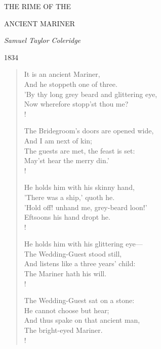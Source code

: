\documentclass[10pt,twoside]{memoir}
\begin{document}
\thispagestyle{empty}

\begin{center}
\vspace*{2.5in}

{\Large THE RIME OF THE}

{\Large ANCIENT MARINER}

\vspace{0.8in}

{\large\itshape Samuel Taylor Coleridge}

\vspace{0.4in}

{\footnotesize 1834}

\end{center}

\clearpage

\begin{verse}


\bigskip

It is an ancient Mariner, \\
And he stoppeth one of three. \\
'By thy long grey beard and glittering eye, \\
Now wherefore stopp'st thou me? \\!

The Bridegroom's doors are opened wide, \\
And I am next of kin; \\
The guests are met, the feast is set: \\
May'st hear the merry din.' \\!

He holds him with his skinny hand, \\
'There was a ship,' quoth he. \\
'Hold off! unhand me, grey-beard loon!' \\
Eftsoons his hand dropt he. \\!

He holds him with his glittering eye— \\
The Wedding-Guest stood still, \\
And listens like a three years' child: \\
The Mariner hath his will. \\!

The Wedding-Guest sat on a stone: \\
He cannot choose but hear; \\
And thus spake on that ancient man, \\
The bright-eyed Mariner. \\!


\end{verse}
\end{document}
